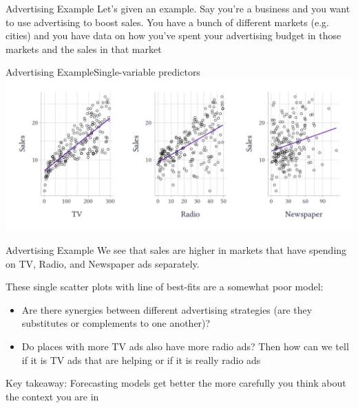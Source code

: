 \documentclass[aspectratio=169,t,11pt,table]{beamer}
\begin{document}

\begin{frame}{Advertising Example}
  Let's given an example. Say you're a business and you want to use advertising to boost sales. You have a bunch of different markets (e.g. cities) and you have data on how you've spent your advertising budget in those markets and the sales in that market
\end{frame}

\begin{frame}{Advertising Example}{Single-variable predictors}
  \includegraphics[width=\textwidth]{figures/sales_bivariate.pdf}
\end{frame}

\begin{frame}{Advertising Example}
  We see that sales are higher in markets that have spending on TV, Radio, and Newspaper ads separately. 
  
  \pause
  \bigskip 
  These single scatter plots with line of best-fits are a somewhat poor model:
  \begin{itemize}
    \item Are there synergies between different advertising strategies (are they substitutes or complements to one another)?
    \item Do places with more TV ads also have more radio ads? Then how can we tell if it is TV ads that are helping or if it is really radio ads 
  \end{itemize}

  \pause\bigskip
  \alert{Key takeaway:} Forecasting models get better the more carefully you think about the context you are in
\end{frame}
\end{document}
